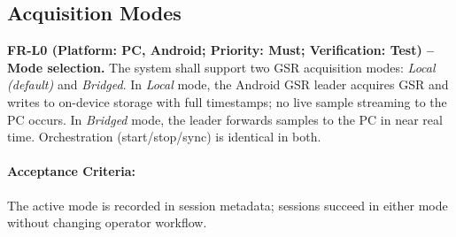 \documentclass{report}
\begin{document}
    \subsection*{Acquisition Modes}
    \begin{description}[leftmargin=0cm]
        \item \textbf{FR-L0 (Platform: PC, Android; Priority: Must; Verification: Test) – Mode selection.}
        The system shall support two GSR acquisition modes: \emph{Local (default)} and \emph{Bridged}. In \emph{Local} mode, the Android GSR leader acquires GSR and writes to on-device storage with full timestamps; no live sample streaming to the PC occurs. In \emph{Bridged} mode, the leader forwards samples to the PC in near real time. Orchestration (start/stop/sync) is identical in both.
        \paragraph{Acceptance Criteria:} The active mode is recorded in session metadata; sessions succeed in either mode without changing operator workflow.
    \end{description}
\end{document}
